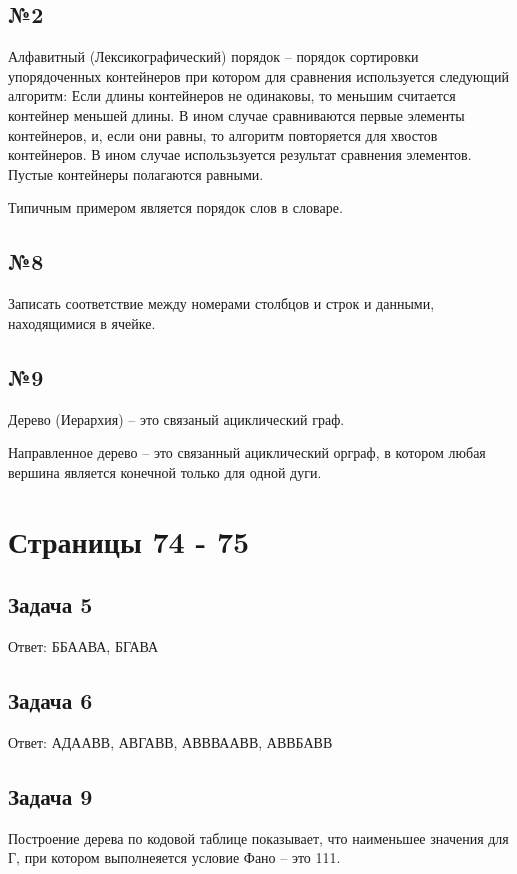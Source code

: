 \documentclass[12pt, a4paper]{article}
\begin{document}
  \subsection{№2}
  Алфавитный (Лексикографический) порядок -- порядок сортировки упорядоченных 
  контейнеров при котором для сравнения используется следующий алгоритм:
  Если длины контейнеров не одинаковы, то меньшим считается контейнер меньшей 
  длины. В ином случае сравниваются первые элементы контейнеров, и, если они 
  равны, то алгоритм повторяется для хвостов контейнеров. В ином случае 
  использьзуется результат сравнения элементов. Пустые контейнеры полагаются 
  равными.

  Типичным примером является порядок слов в словаре.

  \subsection{№8}
  Записать соответствие между номерами столбцов и строк и данными, находящимися
  в ячейке.

  \subsection{№9}
  Дерево (Иерархия) -- это связаный ациклический граф.

  Направленное дерево -- это связанный ациклический орграф, в котором любая вершина 
  является конечной только для одной дуги.

  \section{Страницы 74 - 75}
  \subsection{Задача 5}
  Ответ: ББААВА, БГАВА

  \subsection{Задача 6}
  Ответ: АДААВВ, АВГАВВ, АВВВААВВ, АВВБАВВ

  \subsection{Задача 9}
  Построение дерева по кодовой таблице показывает, что наименьшее значения для Г,
  при котором выполнеяется условие Фано -- это 111.
\end{document}

